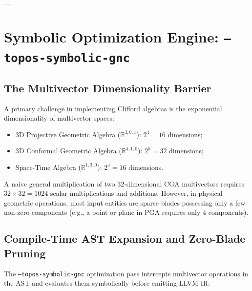 ---

\section{Symbolic Optimization Engine: \texttt{--topos-symbolic-gnc}}
\label{sec:symbolic_gnc}

\subsection{The Multivector Dimensionality Barrier}
A primary challenge in implementing Clifford algebras is the exponential dimensionality of multivector spaces:
\begin{itemize}[leftmargin=1.5cm]
    \item 3D Projective Geometric Algebra ($\mathbb{R}^{3,0,1}$): $2^4 = 16$ dimensions;
    \item 3D Conformal Geometric Algebra ($\mathbb{R}^{4,1,0}$): $2^5 = 32$ dimensions;
    \item Space-Time Algebra ($\mathbb{R}^{1,3,0}$): $2^4 = 16$ dimensions.
\end{itemize}
A naive general multiplication of two 32-dimensional CGA multivectors requires $32 \times 32 = 1024$ scalar multiplications and additions. However, in physical geometric operations, most input entities are sparse blades possessing only a few non-zero components (e.g., a point or plane in PGA requires only 4 components).

\subsection{Compile-Time AST Expansion and Zero-Blade Pruning}
The \texttt{--topos-symbolic-gnc} optimization pass intercepts multivector operations in the AST and evaluates them symbolically before emitting LLVM IR:

